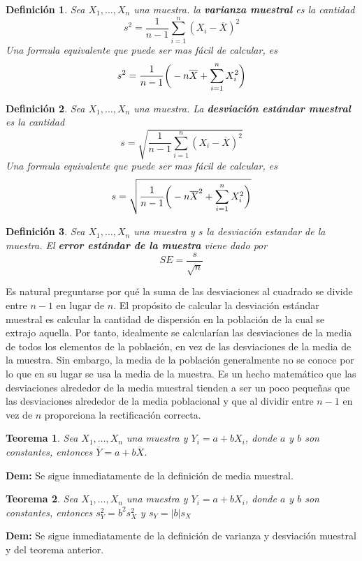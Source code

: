 \documentclass[10pt,a4paper]{book}
\newtheorem{defi}{\textbf{Definición}}
\newtheorem{teo}{\textbf{Teorema}}
\begin{document}
\begin{defi}
	Sea $ X_1, \ldots, X_n $ una muestra. la \textbf{varianza muestral} es la cantidad 
	$$ s^2 = \frac{1}{n-1} \sum_{i=1}^{n} (X_i - \overline{X})^2$$
	Una formula equivalente que puede ser mas fácil de calcular, es
	$$ s^2 = \frac{1}{n-1} \bigg{(} - n\overline{X} + \sum_{i=1}^{n} X^2_i \bigg{)}$$
\end{defi}

\begin{defi}
	Sea $ X_1, \ldots, X_n $ una muestra. La \textbf{desviación estándar muestral} es la cantidad
	$$ s = \sqrt{ \frac{1}{n-1} \sum_{i=1}^{n} (X_i - \overline{X})^2}$$
	Una formula equivalente que puede ser mas fácil de calcular, es
	$$ s = \sqrt{ \frac{1}{n-1} \bigg{(} - n\overline{X}^2 + \sum_{i=1}^{n} X^2_i \bigg{)} }$$
\end{defi}

\begin{defi}
	Sea $ X_1, \ldots, X_n $ una muestra y $ s $ la desviación estandar de la muestra. El \textbf{error estándar de la muestra} viene dado por $$ SE = \frac{s}{\sqrt{n}}$$
\end{defi}

Es natural preguntarse por qué la suma de las desviaciones al cuadrado se divide entre $ n-1 $ en lugar de $ n $. El propósito de calcular la desviación estándar muestral es calcular la cantidad de dispersión en la población de la cual se extrajo aquella. Por tanto, idealmente se calcularían las desviaciones de la media de todos los elementos de la población, en vez de las desviaciones de la media de la muestra. Sin embargo, la media de la población generalmente no se conoce por lo que en su lugar se usa la media de la muestra. Es un hecho matemático que las desviaciones alrededor de la media muestral tienden a ser un poco pequeñas que las desviaciones alrededor de la media poblacional y que al dividir entre $ n-1 $ en vez de $ n $ proporciona la rectificación correcta.

\begin{teo}\label{LinealidadDeLaMedia}
	Sea $ X_1, \ldots, X_n $ una muestra y $ Y_i = a + bX_i $, donde $ a $ y $ b $ son constantes, entonces $ \overline{Y} = a +b\overline{X} $.	
\end{teo}
\textbf{Dem:} Se sigue inmediatamente de la definición de media muestral.

\begin{teo}\label{LinealidadDeLaDesviacion}
	Sea $ X_1, \ldots, X_n $ una muestra y $ Y_i = a + bX_i $, donde $ a $ y $ b $ son constantes, entonces $s^2_Y= b^2 s^2_X$ y $s_Y = |b|s_X$
\end{teo}
\textbf{Dem:} Se sigue inmediatamente de la definición de varianza y desviación muestral y del teorema anterior.
\end{document}

